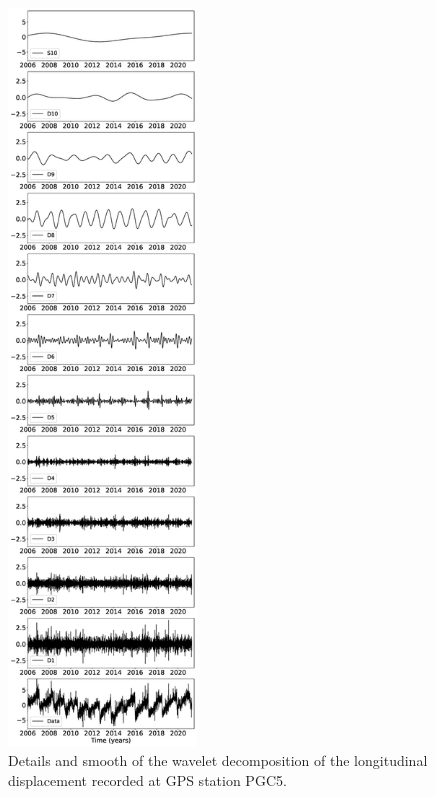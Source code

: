 \documentclass{article}
\begin{document}
\begin{figure}
\noindent\includegraphics[width=5cm, trim={0cm 0cm 0cm 0cm},clip]{figures/cleaned_PGC5_lon.eps}
\caption{Details and smooth of the wavelet decomposition of the longitudinal displacement recorded at GPS station PGC5.}
\label{pngfiguresample}
\end{figure}
\end{document}

